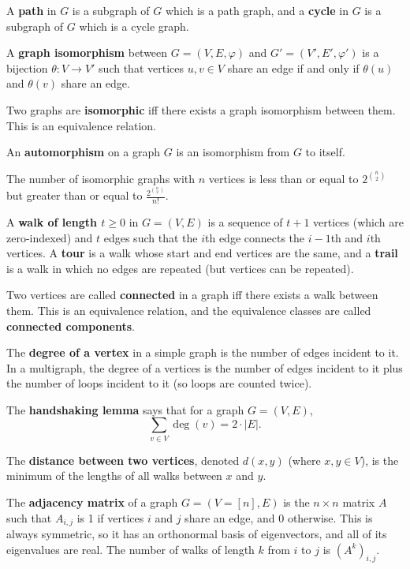 \documentclass[10pt]{article}
\begin{document}
A \textbf{path} in $G$ is a subgraph of $G$ which is a path graph, and a \textbf{cycle} in $G$ is a subgraph of $G$ which is a cycle graph.
\par
A \textbf{graph isomorphism} between $G=(V,E,\varphi)$ and $G'=(V',E',\varphi')$ is a bijection $\theta: V \rightarrow V'$ such that vertices $u,v \in V$ share an edge if and only if $\theta(u)$ and $\theta(v)$ share an edge.
\par
Two graphs are \textbf{isomorphic} iff there exists a graph isomorphism between them. This is an equivalence relation.
\par
An \textbf{automorphism} on a graph $G$ is an isomorphism from $G$ to itself.
\par
The number of isomorphic graphs with $n$ vertices is less than or equal to $2^{\binom{n}{2}}$ but greater than or equal to $\frac{2^{\binom{n}{2}}}{n!}$.
\par
A \textbf{walk of length $t\geq0$} in $G=(V,E)$ is a sequence of $t+1$ vertices (which are zero-indexed) and $t$ edges such that the $i$th edge connects the $i-1$th and $i$th vertices. A \textbf{tour} is a walk whose start and end vertices are the same, and a \textbf{trail} is a walk in which no edges are repeated (but vertices can be repeated).
\par
Two vertices are called \textbf{connected} in a graph iff there exists a walk between them. This is an equivalence relation, and the equivalence classes are called \textbf{connected components}.
\par
The \textbf{degree of a vertex} in a simple graph is the number of edges incident to it. In a multigraph, the degree of a vertices is the number of edges incident to it plus the number of loops incident to it (so loops are counted twice).
\par
The \textbf{handshaking lemma} says that for a graph $G=(V,E)$,
\[ \sum_{v \in V} \operatorname{deg}(v) = 2 \cdot |E|. \]
\par
The \textbf{distance between two vertices}, denoted $d(x,y)$ (where $x,y \in V$), is the minimum of the lengths of all walks between $x$ and $y$.
\par
The \textbf{adjacency matrix} of a graph $G=(V=[n],E)$ is the $n\times n$ matrix $A$ such that $A_{i,j}$ is 1 if vertices $i$ and $j$ share an edge, and 0 otherwise. This is always symmetric, so it has an orthonormal basis of eigenvectors, and all of its eigenvalues are real. The number of walks of length $k$ from $i$ to $j$ is $\left( A^k \right)_{i,j}$.
\par
\end{document}
